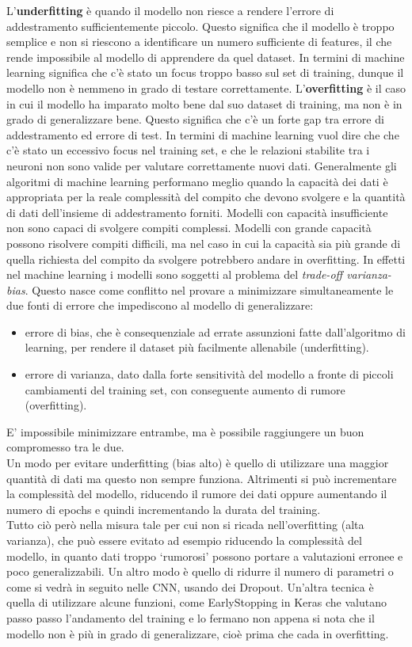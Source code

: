 L’\textbf{underfitting} è quando il modello non riesce a rendere l’errore di addestramento
 sufficientemente piccolo. Questo significa che il modello è troppo semplice e non si 
 riescono a identificare un numero sufficiente di features, il che rende impossibile al 
 modello di apprendere da quel dataset. In termini di machine learning significa che c’è 
 stato un focus troppo basso sul set di training, dunque il modello non è nemmeno in grado
  di testare correttamente.
L’\textbf{overfitting} è il caso in cui il modello ha imparato molto bene dal suo dataset di training,
 ma non è in grado di generalizzare bene. Questo significa che c’è un forte gap tra errore 
 di addestramento ed errore di test. In termini di machine learning vuol dire che che c’è
  stato un eccessivo focus nel training set, e che le relazioni stabilite tra i neuroni
   non sono valide per valutare correttamente nuovi dati.  
Generalmente gli algoritmi di machine learning performano meglio quando la capacità dei dati 
è appropriata per la reale complessità del compito che devono svolgere e la quantità di dati 
dell’insieme di addestramento forniti. Modelli con capacità insufficiente non sono capaci di
 svolgere compiti complessi. Modelli con grande capacità possono risolvere compiti difficili,
  ma nel caso in cui la capacità sia più grande di quella richiesta del compito da svolgere
   potrebbero andare in overfitting.
In effetti nel machine learning i modelli sono soggetti al problema del \emph{trade-off varianza-bias}.
 Questo nasce come conflitto nel provare a minimizzare simultaneamente le due fonti di errore che 
 impediscono al modello di generalizzare:
 \begin{itemize}
     \item errore di bias, che è consequenziale ad errate assunzioni fatte dall’algoritmo di learning, 
per rendere il dataset più facilmente allenabile (underfitting).
\item errore di varianza, dato dalla forte sensitività del modello a fronte di piccoli cambiamenti 
del training set, con conseguente aumento di rumore (overfitting). 
\end{itemize}
E’ impossibile minimizzare entrambe, ma è possibile raggiungere un buon compromesso tra le due. \\
Un modo per evitare underfitting (bias alto) è quello di utilizzare una maggior quantità di 
dati ma questo non sempre funziona. Altrimenti si può incrementare la complessità del modello, 
riducendo il rumore dei dati oppure aumentando il numero di epochs e quindi incrementando la
 durata del training. \\
Tutto ciò però nella misura tale per cui non si ricada nell’overfitting (alta varianza), 
che può essere evitato ad esempio riducendo la complessità del modello, in quanto dati
 troppo ‘rumorosi’ possono portare a valutazioni erronee e poco generalizzabili. Un altro
  modo è quello di ridurre il numero di parametri o come si vedrà in seguito nelle CNN, usando dei Dropout.
   Un’altra tecnica è quella di utilizzare alcune funzioni, come EarlyStopping in Keras che
    valutano passo passo l’andamento del training e lo fermano non appena si nota che 
    il modello non è più in grado di generalizzare, cioè prima che cada in overfitting.
